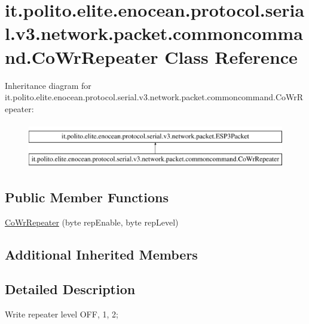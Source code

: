 \hypertarget{classit_1_1polito_1_1elite_1_1enocean_1_1protocol_1_1serial_1_1v3_1_1network_1_1packet_1_1commoncommand_1_1_co_wr_repeater}{}\section{it.\+polito.\+elite.\+enocean.\+protocol.\+serial.\+v3.\+network.\+packet.\+commoncommand.\+Co\+Wr\+Repeater Class Reference}
\label{classit_1_1polito_1_1elite_1_1enocean_1_1protocol_1_1serial_1_1v3_1_1network_1_1packet_1_1commoncommand_1_1_co_wr_repeater}
Inheritance diagram for it.\+polito.\+elite.\+enocean.\+protocol.\+serial.\+v3.\+network.\+packet.\+commoncommand.\+Co\+Wr\+Repeater\+:\begin{figure}[H]
\begin{center}
\leavevmode
\includegraphics[height=2.000000cm]{classit_1_1polito_1_1elite_1_1enocean_1_1protocol_1_1serial_1_1v3_1_1network_1_1packet_1_1commoncommand_1_1_co_wr_repeater}
\end{center}
\end{figure}
\subsection*{Public Member Functions}
\begin{DoxyCompactItemize}
\item 
\hyperlink{classit_1_1polito_1_1elite_1_1enocean_1_1protocol_1_1serial_1_1v3_1_1network_1_1packet_1_1commoncommand_1_1_co_wr_repeater_a3ca7952e552b41ef03cf877ad71513a4}{Co\+Wr\+Repeater} (byte rep\+Enable, byte rep\+Level)
\end{DoxyCompactItemize}
\subsection*{Additional Inherited Members}


\subsection{Detailed Description}
Write repeater level O\+FF, 1, 2;

